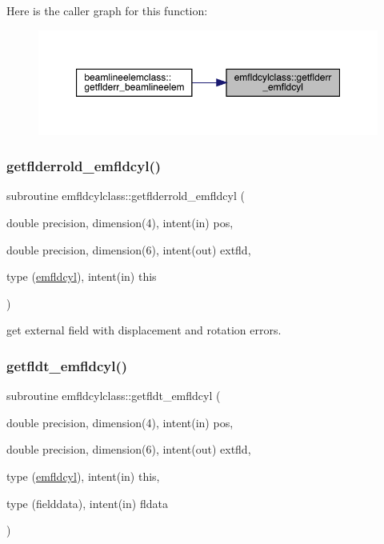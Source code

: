 Here is the caller graph for this function\+:\nopagebreak
\begin{figure}[H]
\begin{center}
\leavevmode
\includegraphics[width=350pt]{namespaceemfldcylclass_a2527e326fcd93dd1a661712a4c591de1_icgraph}
\end{center}
\end{figure}
\mbox{\label{namespaceemfldcylclass_a413e910d3137ed962527e2738f50e528}} 
\subsubsection{\texorpdfstring{getflderrold\_emfldcyl()}{getflderrold\_emfldcyl()}}
{\footnotesize\ttfamily subroutine emfldcylclass\+::getflderrold\+\_\+emfldcyl (\begin{DoxyParamCaption}\item[{double precision, dimension(4), intent(in)}]{pos,  }\item[{double precision, dimension(6), intent(out)}]{extfld,  }\item[{type (\mbox{\hyperlink{namespaceemfldcylclass_structemfldcylclass_1_1emfldcyl}{emfldcyl}}), intent(in)}]{this }\end{DoxyParamCaption})}



get external field with displacement and rotation errors. 

\mbox{\label{namespaceemfldcylclass_a82e58a65bbe911b6f676ddb81868db31}} 
\subsubsection{\texorpdfstring{getfldt\_emfldcyl()}{getfldt\_emfldcyl()}}
{\footnotesize\ttfamily subroutine emfldcylclass\+::getfldt\+\_\+emfldcyl (\begin{DoxyParamCaption}\item[{double precision, dimension(4), intent(in)}]{pos,  }\item[{double precision, dimension(6), intent(out)}]{extfld,  }\item[{type (\mbox{\hyperlink{namespaceemfldcylclass_structemfldcylclass_1_1emfldcyl}{emfldcyl}}), intent(in)}]{this,  }\item[{type (fielddata), intent(in)}]{fldata }\end{DoxyParamCaption})}



